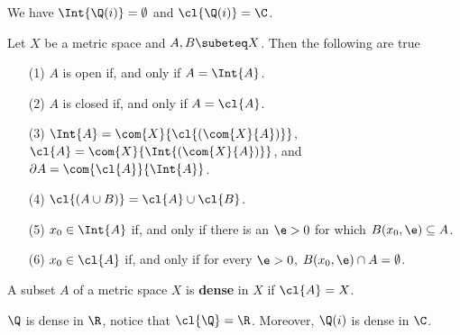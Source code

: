 \begin{example}\label{example_2.3}
    We have $\Int{\Q(i)}=\emptyset$ and $\cl{\Q(i)}=\C$.
\end{example}

\begin{lemma}\label{2.1.3}
    Let $X$ be a metric space and  $A,B \subeteq X$. Then the following are true
    \begin{enumerate}
        \item[(1)] $A$ is open if, and only if  $A=\Int{A}$.

        \item[(2)] $A$ is closed if, and only if  $A=\cl{A}$.

        \item[(3)] $\Int{A}=\com{X}{\cl{(\com{X}{A})}}$,
            $\cl{A}=\com{X}{\Int{(\com{X}{A})}}$, and
            $\partial{A}=\com{\cl{A}}{\Int{A}}$.

        \item[(4)] $\cl{(A \cup B)}=\cl{A} \cup \cl{B}$.

        \item[(5)] $x_0 \in \Int{A}$ if, and only if there is an $\e>0$ for
            which  $B(x_0,\e) \subseteq A$.

        \item[(6)] $x_0 \in \cl{A}$ if, and only if for every $\e>0$, $B(x_0,\e)
            \cap A=\emptyset$.
    \end{enumerate}
\end{lemma}

\begin{definition}
    A subset $A$ of a metric space $X$ is \textbf{dense} in $X$ if  $\cl{A}=X$.
\end{definition}

\begin{example}\label{example_2.4}
    $\Q$ is dense in  $\R$, notice that  $\cl{\Q}=\R$. Moreover, $\Q(i)$ is
    dense in $\C$.
\end{example}
